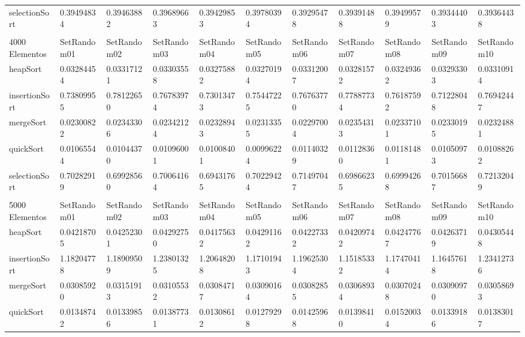 \documentclass[article,a4paper]{article}
\begin{document}
\begin{table}[h]
{\begin{tabular}{lllllllllll}
selectionSort   & 0.39494834  & 0.39463882  & 0.39689663  & 0.39429853  & 0.39780394  & 0.39295478  & 0.39391488  & 0.39499579  & 0.39344403  & 0.39364438  \\
                &             &             &             &             &             &             &             &             &             &             \\
4000 Elementos  & SetRandom01 & SetRandom02 & SetRandom03 & SetRandom04 & SetRandom05 & SetRandom06 & SetRandom07 & SetRandom08 & SetRandom09 & SetRandom10 \\
heapSort        & 0.03284454  & 0.03317121  & 0.03303558  & 0.03275882  & 0.03270194  & 0.03312007  & 0.03281572  & 0.03249362  & 0.03293303  & 0.03310914  \\
insertionSort   & 0.73809955  & 0.78122650  & 0.76783974  & 0.73013473  & 0.75447225  & 0.76763770  & 0.77887734  & 0.76187592  & 0.71228048  & 0.76942447  \\
mergeSort       & 0.02300822  & 0.02343306  & 0.02342124  & 0.02328943  & 0.02313355  & 0.02297004  & 0.02354313  & 0.02337101  & 0.02330195  & 0.02324881  \\
quickSort       & 0.01065544  & 0.01044370  & 0.01096001  & 0.01008401  & 0.00996224  & 0.01140329  & 0.01128360  & 0.01181481  & 0.01050973  & 0.01088262  \\
selectionSort   & 0.70282919  & 0.69928560  & 0.70064164  & 0.69431765  & 0.70229424  & 0.71497047  & 0.69866235  & 0.69994268  & 0.70156687  & 0.72132049  \\
                &             &             &             &             &             &             &             &             &             &             \\
5000 Elementos  & SetRandom01 & SetRandom02 & SetRandom03 & SetRandom04 & SetRandom05 & SetRandom06 & SetRandom07 & SetRandom08 & SetRandom09 & SetRandom10 \\
heapSort        & 0.04218705  & 0.04252301  & 0.04292750  & 0.04175632  & 0.04291162  & 0.04227332  & 0.04209742  & 0.04247767  & 0.04263719  & 0.04305448  \\
insertionSort   & 1.18204778  & 1.18909509  & 1.23801325  & 1.20648208  & 1.17101943  & 1.19625304  & 1.15185332  & 1.17470414  & 1.16457618  & 1.23412736  \\
mergeSort       & 0.03085920  & 0.03151913  & 0.03105532  & 0.03084717  & 0.03090164  & 0.03082855  & 0.03068934  & 0.03070248  & 0.03090970  & 0.03058693  \\
quickSort       & 0.01348742  & 0.01339856  & 0.01387731  & 0.01308612  & 0.01279298  & 0.01425968  & 0.01398410  & 0.01520034  & 0.01339186  & 0.01383017  \\

\end{tabular}}
\end{table}
\end{document}
